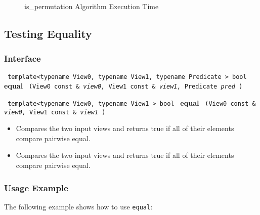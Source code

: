 \begin{figure}[p]
\caption{is\_permutation Algorithm Execution Time}
\label{fig:is-perm-alg-exec-exper}
\end{figure}

 
\subsection{Testing Equality} \label{sec-sumry-equal}

\subsubsection{Interface} %

\noindent
\texttt{%
template<typename View0, typename View1, typename Predicate >
\newline
bool 
}
\newline
\textbf{equal}%
\texttt{%
(View0 const \&
\textit{view0,}%
View1 const \&
\textit{view1,}%
Predicate 
\textit{pred}%
)
}
\vspace{0.4cm}

\noindent
\texttt{%
template<typename View0, typename View1 >
\newline
bool 
}
\newline
\textbf{equal}%
\texttt{%
(View0 const \&
\textit{view0,}%
View1 const \&
\textit{view1}%
)
}

\begin{itemize}
\item
Compares the two input views and returns true if all of their elements compare pairwise equal. 
\item
Compares the two input views and returns true if all of their elements compare pairwise equal. 
\end{itemize}

\subsubsection{Usage Example} %

The following example shows how to use \texttt{equal}:

 
